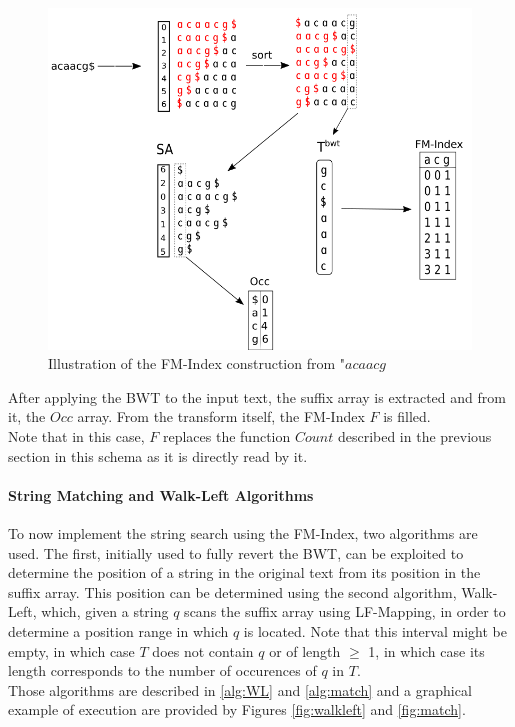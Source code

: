 \begin{minipage}{0.5\textwidth}
\begin{figure}[H]
    \hspace{-15mm}\includegraphics[scale = 0.35]{Figures/FMIndex.png}
    \caption{Illustration of the FM-Index construction from "$acaacg$}
    \label{fig:fmindex}
\end{figure}
\end{minipage}
\hspace{15mm}
\begin{minipage}{0.3\textwidth}
After applying the BWT to the input text, the suffix array is extracted and from it, the $Occ$ array. From the transform itself, the FM-Index $F$ is filled. \\
Note that in this case, $F$ replaces the function $Count$ described in the previous section in this schema as it is directly read by it.
\end{minipage}


\paragraph{String Matching and Walk-Left Algorithms} To now implement the string search using the FM-Index, two algorithms are used. The first, initially used to fully revert the BWT, can be exploited to determine the position of a string in the original text from its position in the suffix array. This position can be determined using the second algorithm, Walk-Left, which, given a string $q$ scans the suffix array using LF-Mapping, in order to determine a position range in which $q$ is located. Note that this interval might be empty, in which case $T$ does not contain $q$ or of length $\geq$ 1, in which case its length corresponds to the number of occurences of $q$ in $T$. \\
Those algorithms are described in \ref{alg:WL} and \ref{alg:match} and a graphical example of execution are provided by Figures \ref{fig:walkleft} and \ref{fig:match}.

